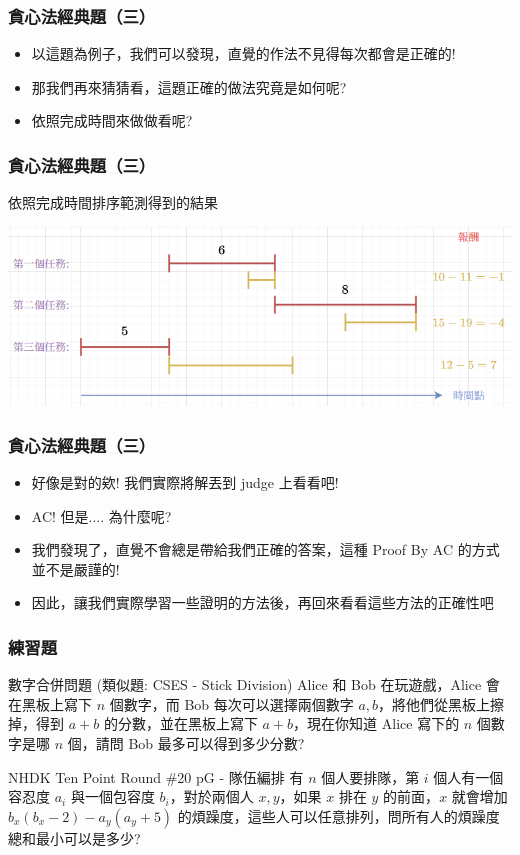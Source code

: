 \documentclass[aspectratio=169]{beamer}
\begin{document}
\begin{frame}
\frametitle{貪心法經典題（三）}
    \begin{itemize}
        \item<1-> 以這題為例子，我們可以發現，直覺的作法不見得每次都會是正確的!
        \item<2-> 那我們再來猜猜看，這題正確的做法究竟是如何呢?
        \item<3-> 依照完成時間來做做看呢?
    \end{itemize}
\end{frame}

\begin{frame}
\frametitle{貪心法經典題（三）}
    依照完成時間排序範測得到的結果
    
    \begin{center}
        \includegraphics[scale=0.68]{images/tasks_and_deadline_2.png}
    \end{center}
\end{frame}

\begin{frame}
\frametitle{貪心法經典題（三）}
    \begin{itemize}
        \item<1-> 好像是對的欸! 我們實際將解丟到 judge 上看看吧!
        \item<2-> AC! 但是.... 為什麼呢?
        \item<3-> 我們發現了，直覺不會總是帶給我們正確的答案，這種 Proof By AC 的方式並不是嚴謹的!
        \item<4-> 因此，讓我們實際學習一些證明的方法後，再回來看看這些方法的正確性吧
    \end{itemize}
\end{frame}
    
\begin{frame}
\frametitle{練習題}
    \begin{block}{數字合併問題 (類似題: CSES - Stick Division)}
        Alice 和 Bob 在玩遊戲，Alice 會在黑板上寫下 $n$ 個數字，而 Bob 每次可以選擇兩個數字 $a, b$，將他們從黑板上擦掉，得到 $a+b$ 的分數，並在黑板上寫下 $a+b$，現在你知道 Alice 寫下的 $n$ 個數字是哪 $n$ 個，請問 Bob 最多可以得到多少分數?
    \end{block}
    \begin{block}{NHDK Ten Point Round \#20 pG - 隊伍編排}
        有 $n$ 個人要排隊，第 $i$ 個人有一個容忍度 $a_i$ 與一個包容度 $b_i$，對於兩個人 $x,y$，如果 $x$ 排在 $y$ 的前面，$x$ 就會增加 $b_x (b_x-2) - a_y (a_y+5)$ 的煩躁度，這些人可以任意排列，問所有人的煩躁度總和最小可以是多少?
    \end{block}
\end{frame}
\end{document}
